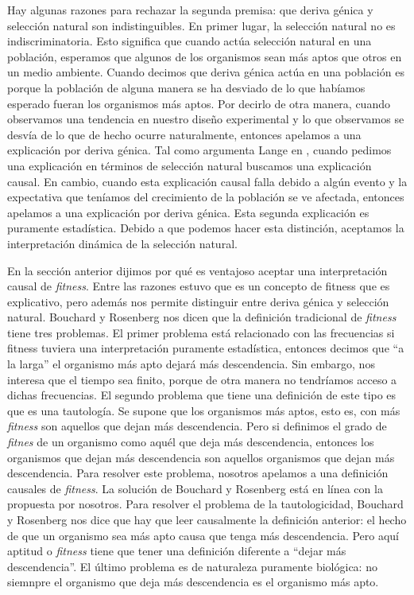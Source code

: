 Hay algunas razones para rechazar la segunda premisa: que deriva génica y selección natural son indistinguibles. En primer lugar, la selección natural no es indiscriminatoria. Esto significa que cuando actúa selección natural en una población, esperamos que algunos de los organismos sean más aptos que otros en un medio ambiente. Cuando decimos que deriva génica actúa en una población es porque la población de alguna manera se ha desviado de lo que habíamos esperado fueran los organismos más aptos. Por decirlo de otra manera, cuando observamos una tendencia en nuestro diseño experimental y lo que observamos se desvía de lo que de hecho ocurre naturalmente, entonces apelamos a una explicación por deriva génica. Tal como argumenta Lange en \citeyear{Lange2013}, cuando pedimos una explicación en términos de selección natural buscamos una explicación causal. En cambio, cuando esta explicación causal falla debido a algún evento y la expectativa que teníamos del crecimiento de la población se ve afectada, entonces apelamos a una explicación por deriva génica. Esta segunda explicación es puramente estadística. Debido a que podemos hacer esta distinción, aceptamos la interpretación dinámica de la selección natural.

En la sección anterior dijimos por qué es ventajoso aceptar una interpretación causal de \emph{fitness}. Entre las razones estuvo que es un concepto de fitness que es explicativo, pero además nos permite distinguir entre deriva génica y selección natural. Bouchard y Rosenberg \cite{Bouchard2004} nos dicen que la definición tradicional de \emph{fitness} tiene tres problemas. El primer problema está relacionado con las frecuencias si fitness tuviera una interpretación puramente estadística, entonces decimos que ``a la larga'' el organismo más apto dejará más descendencia. Sin embargo, nos interesa que el tiempo sea finito, porque de otra manera no tendríamos acceso a dichas frecuencias. El segundo problema que tiene una definición de este tipo es que es una tautología. Se supone que los organismos más aptos, esto es, con más \emph{fitness} son aquellos que dejan más descendencia. Pero si definimos el grado de \emph{fitnes} de un organismo como aquél que deja más descendencia, entonces los organismos que dejan más descendencia son aquellos organismos que dejan más descendencia. Para resolver este problema, nosotros apelamos a una definición causales de \emph{fitness}. La solución de Bouchard y Rosenberg está en línea con la propuesta por nosotros. Para resolver el problema de la tautologicidad, Bouchard y Rosenberg nos dice que hay que leer causalmente la definición anterior: el hecho de que un organismo sea más apto causa que tenga más descendencia. Pero aquí aptitud o \emph{fitness} tiene que tener una definición diferente a ``dejar más descendencia''. El último problema es de naturaleza puramente biológica: no siemnpre el organismo que deja más descendencia es el organismo más apto.

